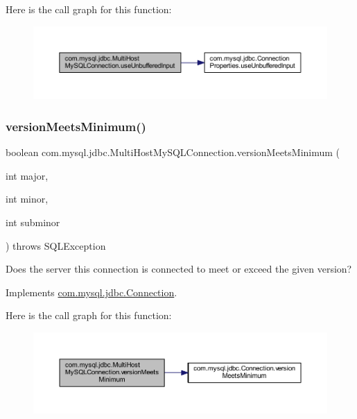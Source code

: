Here is the call graph for this function\+:
\nopagebreak
\begin{figure}[H]
\begin{center}
\leavevmode
\includegraphics[width=350pt]{classcom_1_1mysql_1_1jdbc_1_1_multi_host_my_s_q_l_connection_a5a985fc8b9a0777d6d19e566e8053832_cgraph}
\end{center}
\end{figure}
\mbox{\label{classcom_1_1mysql_1_1jdbc_1_1_multi_host_my_s_q_l_connection_a8e2a15f4a6eef23983bff753a54c0911}} 
\subsubsection{\texorpdfstring{version\+Meets\+Minimum()}{versionMeetsMinimum()}}
{\footnotesize\ttfamily boolean com.\+mysql.\+jdbc.\+Multi\+Host\+My\+S\+Q\+L\+Connection.\+version\+Meets\+Minimum (\begin{DoxyParamCaption}\item[{int}]{major,  }\item[{int}]{minor,  }\item[{int}]{subminor }\end{DoxyParamCaption}) throws S\+Q\+L\+Exception}

Does the server this connection is connected to meet or exceed the given version? 

Implements \mbox{\hyperlink{interfacecom_1_1mysql_1_1jdbc_1_1_connection_af05f0b2545de1a6a1ca7d41f467516d3}{com.\+mysql.\+jdbc.\+Connection}}.

Here is the call graph for this function\+:
\nopagebreak
\begin{figure}[H]
\begin{center}
\leavevmode
\includegraphics[width=350pt]{classcom_1_1mysql_1_1jdbc_1_1_multi_host_my_s_q_l_connection_a8e2a15f4a6eef23983bff753a54c0911_cgraph}
\end{center}
\end{figure}


